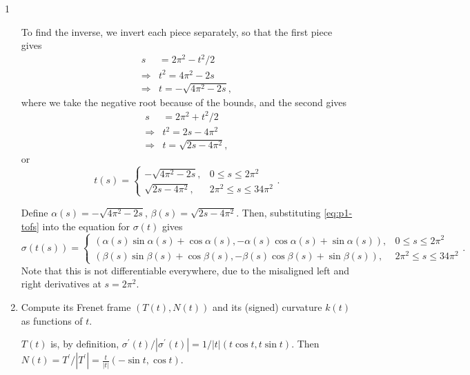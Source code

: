 \documentclass[11pt]{article}
\begin{document}
\begin{problem}{1}
\begin{enumerate}[label=(\alph*)]
\begin{answer}
			      To find the inverse, we invert each piece separately, so that the first piece gives
			      \begin{equation}
				      \label{eq:6}
				      \begin{aligned}
					      s           & = 2\pi^2 - t^2 / 2       \\
					      \Rightarrow & t^2 = 4\pi^2 - 2s        \\
					      \Rightarrow & t = -\sqrt{4\pi^2 - 2s},
				      \end{aligned}
			      \end{equation}
			      where we take the negative root because of the bounds, and the second gives
			      \begin{equation}
				      \label{eq:7}
				      \begin{aligned}
					      s           & = 2\pi^2 + t^2 /2       \\
					      \Rightarrow & t^2 = 2s - 4\pi^2       \\
					      \Rightarrow & t = \sqrt{2s - 4\pi^2},
				      \end{aligned}
			      \end{equation}
			      or
			      \begin{equation}
				      \label{eq:p1-tofs}
				      t(s) = \begin{cases}
					      -\sqrt{4\pi^2 - 2s}, & 0 \leq s \leq 2\pi^2       \\
					      \sqrt{2s - 4\pi^2},  & 2\pi^2 \leq s \leq 34\pi^2
				      \end{cases}.
			      \end{equation}

			      Define \( \alpha(s) = -\sqrt{4\pi^2 - 2s} \), \(\beta(s) = \sqrt{2s - 4\pi^2}\).
			      Then, substituting \cref{eq:p1-tofs} into the equation for \(\sigma(t)\) gives
			      \begin{equation}
				      \label{eq:9}
				      \sigma(t(s)) = \begin{cases}
					      (\alpha(s)\sin\alpha(s) + \cos\alpha(s), -\alpha(s)\cos\alpha(s) + \sin\alpha(s)), & 0 \leq s \leq 2\pi^2       \\
					      (\beta(s)\sin\beta(s) + \cos\beta(s), -\beta(s)\cos\beta(s) + \sin\beta(s)),       & 2\pi^2 \leq s \leq 34\pi^2
				      \end{cases}.
			      \end{equation}
			      Note that this is not differentiable everywhere, due to the misaligned left and right derivatives at \( s = 2\pi^2 \).
		      \end{answer}
		\item Compute its Frenet frame \( (T(t), N(t)) \) and its (signed) curvature \( k(t) \) as functions of \( t \).
		      \begin{answer}
			      \( T(t) \) is, by definition, \(\sigma^{\prime}(t)/|\sigma^{\prime}(t)| = 1/|t|(t\cos t, t \sin t) \).
			      Then \( N(t) = T^{\prime}/|T^{\prime}| = \frac{t}{|t|}(-\sin t, \cos t) \).


\end{answer}
\end{enumerate}
\end{problem}
\end{document}
